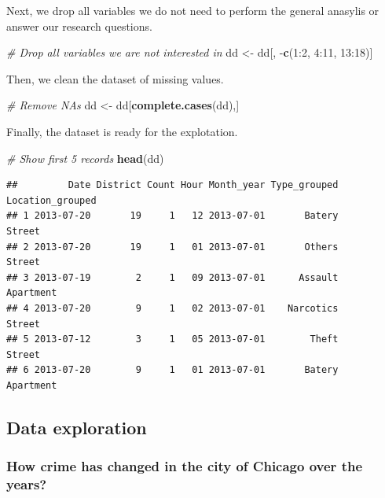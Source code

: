 \documentclass[]{article}
\newenvironment{Shaded}{\begin{snugshade}}{\end{snugshade}}
\newcommand{\KeywordTok}[1]{\textcolor[rgb]{0.13,0.29,0.53}{\textbf{{#1}}}}
\newcommand{\DecValTok}[1]{\textcolor[rgb]{0.00,0.00,0.81}{{#1}}}
\newcommand{\StringTok}[1]{\textcolor[rgb]{0.31,0.60,0.02}{{#1}}}
\newcommand{\CommentTok}[1]{\textcolor[rgb]{0.56,0.35,0.01}{\textit{{#1}}}}
\newcommand{\NormalTok}[1]{{#1}}
\begin{document}
Next, we drop all variables we do not need to perform the general
anasylis or answer our research questions.

\begin{Shaded}
\begin{Highlighting}[]
\CommentTok{# Drop all variables we are not interested in}
\NormalTok{dd <-}\StringTok{ }\NormalTok{dd[, -}\KeywordTok{c}\NormalTok{(}\DecValTok{1}\NormalTok{:}\DecValTok{2}\NormalTok{, }\DecValTok{4}\NormalTok{:}\DecValTok{11}\NormalTok{, }\DecValTok{13}\NormalTok{:}\DecValTok{18}\NormalTok{)]}
\end{Highlighting}
\end{Shaded}

Then, we clean the dataset of missing values.

\begin{Shaded}
\begin{Highlighting}[]
\CommentTok{# Remove NAs}
\NormalTok{dd <-}\StringTok{ }\NormalTok{dd[}\KeywordTok{complete.cases}\NormalTok{(dd),]}
\end{Highlighting}
\end{Shaded}

Finally, the dataset is ready for the explotation.

\begin{Shaded}
\begin{Highlighting}[]
\CommentTok{# Show first 5 records}
\KeywordTok{head}\NormalTok{(dd)}
\end{Highlighting}
\end{Shaded}

\begin{verbatim}
##         Date District Count Hour Month_year Type_grouped Location_grouped
## 1 2013-07-20       19     1   12 2013-07-01       Batery           Street
## 2 2013-07-20       19     1   01 2013-07-01       Others           Street
## 3 2013-07-19        2     1   09 2013-07-01      Assault        Apartment
## 4 2013-07-20        9     1   02 2013-07-01    Narcotics           Street
## 5 2013-07-12        3     1   05 2013-07-01        Theft           Street
## 6 2013-07-20        9     1   01 2013-07-01       Batery        Apartment
\end{verbatim}

\subsection{Data exploration}\label{data-exploration}

\subsubsection{How crime has changed in the city of Chicago over the
years?}\label{how-crime-has-changed-in-the-city-of-chicago-over-the-years}
\end{document}
